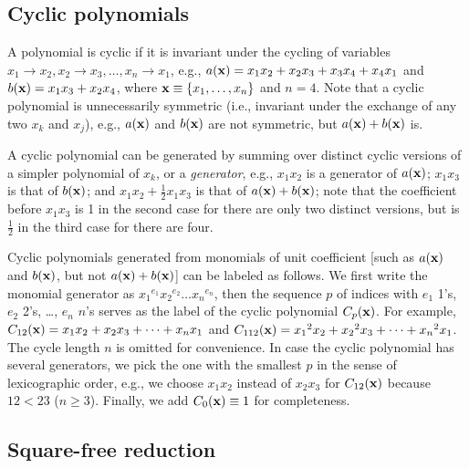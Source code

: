 \documentclass[twocolumn]{revtex4-1}
\begin{document}
\subsection{\label{sec:cyclic}Cyclic polynomials}


A polynomial is cyclic if it is invariant
  under the cycling of variables
  $x_1 \rightarrow x_2, x_2 \rightarrow x_3,
  \ldots, x_n \rightarrow x_1$,
  e.g., $a(\mathbf{x}) = x_1 x_2 + x_2 x_3 + x_3 x_4 + x_4 x_1$
  and $b(\mathbf{x}) = x_1 x_3 + x_2 x_4$,
  where $\mathbf{x} \equiv \{x_1, \ldots, x_n\}$ and $n = 4$.
Note that a cyclic polynomial is unnecessarily symmetric
  (i.e., invariant under the exchange of any two $x_k$ and $x_{j}$),
  e.g., $a(\mathbf{x})$ and $b(\mathbf{x})$ are not symmetric,
  but $a(\mathbf{x}) + b(\mathbf{x})$ is.


A cyclic polynomial can be generated by summing over
  distinct cyclic versions of a simpler polynomial of $x_k$, or a \emph{generator},
e.g.,
$x_1 x_2$ is a generator of $a(\mathbf{x})$;
$x_1 x_3$ is that of $b(\mathbf{x})$;
and
$x_1 x_2 + \frac{1}{2} x_1 x_3$ is that of $a(\mathbf{x}) + b(\mathbf{x})$;
note that the coefficient before $x_1 x_3$
  is 1 in the second case
  for there are only two distinct versions,
  but is $\frac{1}{2}$ in the third case
  for there are four. %




Cyclic polynomials
  generated from monomials of unit coefficient
  [such as $a(\mathbf{x})$ and $b(\mathbf{x})$, but not $a(\mathbf{x}) + b(\mathbf{x})$]
  can be labeled as follows.
We first write the monomial generator as
  ${x_1}^{e_1} {x_2}^{e_2} \dots {x_n}^{e_n}$,
  then the sequence $p$ of indices with
  $e_1$ 1's, $e_2$ 2's, \ldots, $e_n$ $n$'s
  serves as the label of the cyclic polynomial $C_p(\mathbf{x})$.
For example,
  $C_{12}(\mathbf{x})  = x_1 x_2 + x_2 x_3 + \dots + x_n x_1$ and
  $C_{112}(\mathbf{x}) = {x_1}^2 x_2 + {x_2}^2 x_3 + \dots + {x_n}^2 x_1$.
The cycle length $n$ is omitted for convenience.
In case the cyclic polynomial has several generators,
  we pick the one with the smallest $p$
  in the sense of lexicographic order,
  e.g., we choose $x_1 x_2$ instead of $x_2 x_3$ for $C_{12}(\mathbf{x})$
  because $12 < 23$ ($n \ge 3$).
Finally, we add $C_0(\mathbf{x}) \equiv 1$ for completeness.
%
%
%



\subsection{Square-free reduction}
\end{document}
